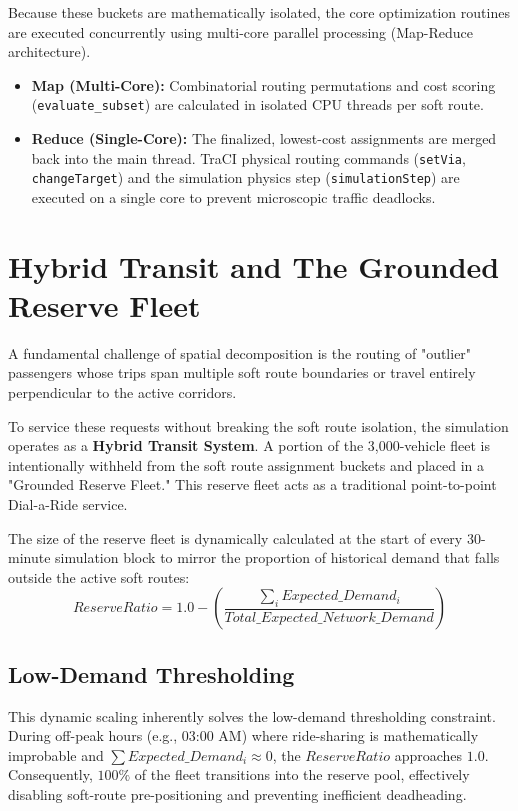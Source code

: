 \documentclass[12pt,a4paper]{article}
\begin{document}
Because these buckets are mathematically isolated, the core optimization routines are executed concurrently using multi-core parallel processing (Map-Reduce architecture). 
\begin{itemize}
    \item \textbf{Map (Multi-Core):} Combinatorial routing permutations and cost scoring (\texttt{evaluate\_subset}) are calculated in isolated CPU threads per soft route.
    \item \textbf{Reduce (Single-Core):} The finalized, lowest-cost assignments are merged back into the main thread. TraCI physical routing commands (\texttt{setVia}, \texttt{changeTarget}) and the simulation physics step (\texttt{simulationStep}) are executed on a single core to prevent microscopic traffic deadlocks.
\end{itemize}

\section{Hybrid Transit and The Grounded Reserve Fleet}
A fundamental challenge of spatial decomposition is the routing of "outlier" passengers whose trips span multiple soft route boundaries or travel entirely perpendicular to the active corridors.

To service these requests without breaking the soft route isolation, the simulation operates as a \textbf{Hybrid Transit System}. A portion of the 3,000-vehicle fleet is intentionally withheld from the soft route assignment buckets and placed in a "Grounded Reserve Fleet." This reserve fleet acts as a traditional point-to-point Dial-a-Ride service.

The size of the reserve fleet is dynamically calculated at the start of every 30-minute simulation block to mirror the proportion of historical demand that falls outside the active soft routes:
\begin{equation}
    ReserveRatio = 1.0 - \left( \frac{\sum_{i} Expected\_Demand_i}{Total\_Expected\_Network\_Demand} \right)
\end{equation}

\subsection{Low-Demand Thresholding}
This dynamic scaling inherently solves the low-demand thresholding constraint. During off-peak hours (e.g., 03:00 AM) where ride-sharing is mathematically improbable and $\sum Expected\_Demand_i \approx 0$, the $ReserveRatio$ approaches $1.0$. Consequently, $100\%$ of the fleet transitions into the reserve pool, effectively disabling soft-route pre-positioning and preventing inefficient deadheading.
\end{document}

